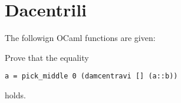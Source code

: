 \section{Dacentrili}
The followign OCaml functions are given:

Prove that the equality
\begin{center}
    \begin{lstlisting}
a = pick_middle 0 (damcentravi [] (a::b))\end{lstlisting}
\end{center}
holds.